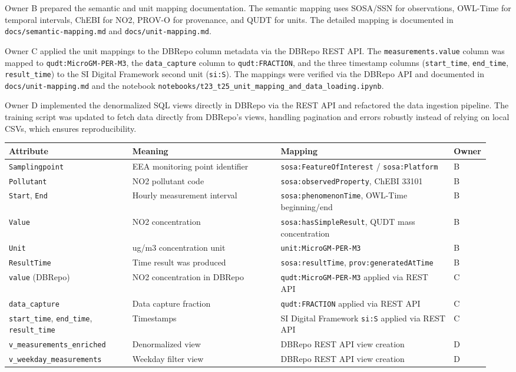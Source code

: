 \documentclass[10pt,a4paper]{article}
\begin{document}
Owner B prepared the semantic and unit mapping documentation. The semantic mapping
uses SOSA/SSN for observations, OWL-Time for temporal intervals, ChEBI for NO2,
PROV-O for provenance, and QUDT for units. The detailed mapping is documented in
\texttt{docs/semantic-mapping.md} and \texttt{docs/unit-mapping.md}.

Owner C applied the unit mappings to the DBRepo column metadata via the DBRepo
REST API. The \texttt{measurements.value} column was mapped to
\texttt{qudt:MicroGM-PER-M3}, the \texttt{data\_capture} column to
\texttt{qudt:FRACTION}, and the three timestamp columns (\texttt{start\_time},
\texttt{end\_time}, \texttt{result\_time}) to the SI Digital Framework second unit
(\texttt{si:S}). The mappings were verified via the DBRepo API and documented in
\texttt{docs/unit-mapping.md} and the notebook
\texttt{notebooks/t23\_t25\_unit\_mapping\_and\_data\_loading.ipynb}.

Owner D implemented the denormalized SQL views directly in DBRepo via the REST API and refactored the data ingestion pipeline. The training script was updated to fetch data directly from DBRepo's views, handling pagination and errors robustly instead of relying on local CSVs, which ensures reproducibility.

\noindent\begin{tabular}{p{0.25\linewidth}p{0.30\linewidth}p{0.35\linewidth}p{0.05\linewidth}}
\toprule
Attribute & Meaning & Mapping & Owner \\
\midrule
\texttt{Samplingpoint} & EEA monitoring point identifier & \texttt{sosa:FeatureOfInterest} / \texttt{sosa:Platform} & B \\
\texttt{Pollutant} & NO2 pollutant code & \texttt{sosa:observedProperty}, ChEBI 33101 & B \\
\texttt{Start}, \texttt{End} & Hourly measurement interval & \texttt{sosa:phenomenonTime}, OWL-Time beginning/end & B \\
\texttt{Value} & NO2 concentration & \texttt{sosa:hasSimpleResult}, QUDT mass concentration & B \\
\texttt{Unit} & ug/m3 concentration unit & \texttt{unit:MicroGM-PER-M3} & B \\
\texttt{ResultTime} & Time result was produced & \texttt{sosa:resultTime}, \texttt{prov:generatedAtTime} & B \\
\texttt{value} (DBRepo) & NO2 concentration in DBRepo & \texttt{qudt:MicroGM-PER-M3} applied via REST API & C \\
\texttt{data\_capture} & Data capture fraction & \texttt{qudt:FRACTION} applied via REST API & C \\
\texttt{start\_time}, \texttt{end\_time}, \texttt{result\_time} & Timestamps & SI Digital Framework \texttt{si:S} applied via REST API & C \\
\texttt{v\_measurements\_enriched} & Denormalized view & DBRepo REST API view creation & D \\
\texttt{v\_weekday\_measurements} & Weekday filter view & DBRepo REST API view creation & D \\
\bottomrule
\end{tabular}
\end{document}

